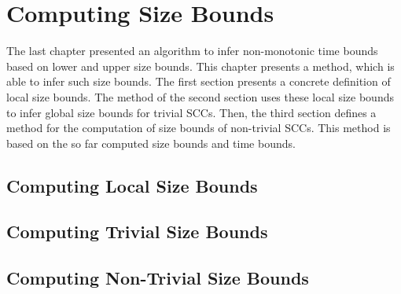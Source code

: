 \section{Computing Size Bounds}

The last chapter presented an algorithm to infer non-monotonic time bounds based on lower and upper size bounds.
This chapter presents a method, which is able to infer such size bounds.
The first section presents a concrete definition of local size bounds.
The method of the second section uses these local size bounds to infer global size bounds for trivial SCCs.
Then, the third section defines a method for the computation of size bounds of non-trivial SCCs.
This method is based on the so far computed size bounds and time bounds.

\subsection{Computing Local Size Bounds}



\subsection{Computing Trivial Size Bounds}



\subsection{Computing Non-Trivial Size Bounds}


